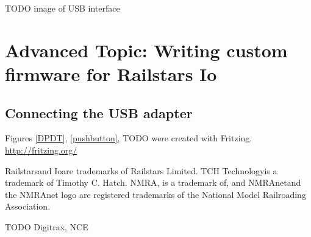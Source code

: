 \documentclass[12pt]{book}
\begin{document}
TODO image of USB interface

\chapter{Advanced Topic: Writing custom firmware for Railstars Io}

\section{Connecting the USB adapter}
\label{FTDI}



\printindex

\newpage
Figures \ref{DPDT}, \ref{pushbutton}, TODO were created with Fritzing. \url{http://fritzing.org/}

Railstars\texttrademark and Io\texttrademark are trademarks of Railstars Limited. TCH Technology\texttrademark is a trademark of Timothy C. Hatch. NMRA\texttrademark, is a trademark of, and NMRAnet\textregistered and the NMRAnet logo are registered trademarks of the National Model Railroading Association.

TODO Digitrax, NCE
\end{document}
